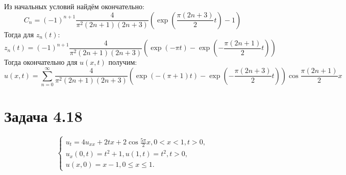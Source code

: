 \documentclass[11pt]{article}
\begin{document}
Из начальных условий найдём окончательно:
\begin{equation*}
C_n = (-1)^{n + 1}\frac4{\pi^2(2n + 1)(2n + 3)}\left(\exp\left(\frac{\pi(2n + 3)}2t\right) - 1\right)
\end{equation*}
Тогда для $z_n(t)$:
\begin{equation*}
z_n(t) = (-1)^{n + 1}\frac4{\pi^2(2n + 1)(2n + 3)}\left(\exp(-\pi t) - \exp\left(-\frac{\pi(2n + 1)}2t\right)\right)
\end{equation*}
Тогда окончательно для $u(x, t)$ получим:
\begin{equation}
u(x, t) = \sum_{n = 0}^{\infty}\frac4{\pi^2(2n + 1)(2n + 3)}\left(\exp(-(\pi + 1)t) -
\exp\left(-\frac{\pi(2n + 3)}2t\right)\right)\cos\frac{\pi(2n + 1)}2x
\end{equation}
\section{Задача 4.18}
\label{sec:org0ed25dd}
\begin{equation}
\begin{cases}
u_t = 4u_{xx} + 2tx + 2\cos\frac{5\pi}2x, 0 < x < 1, t > 0, \\
u_x(0, t) = t^2 + 1, u(1, t) = t^2, t > 0, \\
u(x, 0) = x - 1, 0 \leq x \leq 1.
\end{cases}
\end{equation}
\end{document}
